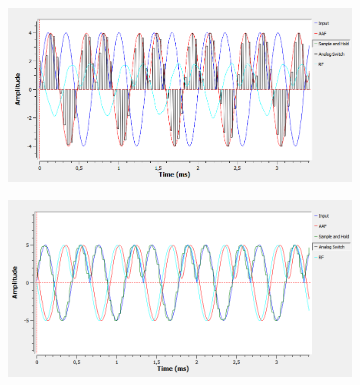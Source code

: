 \begin{figure}[H]
	\begin{subfigure}{.5\textwidth}
	\centering
	\includegraphics[width=\textwidth]{SimulacionesGNURADIO/Condiciones_optimas/SENO32_TIEMPO_LLAVE_BC.PNG}
	\end{subfigure}
	\begin{subfigure}{.5\textwidth}
	\centering

		\includegraphics[width=\textwidth]{SimulacionesGNURADIO/Condiciones_optimas/SENO32_TIEMPO_SAMPLE_AND_HOLD_BC.PNG}
	\end{subfigure}
	

\end{figure}
